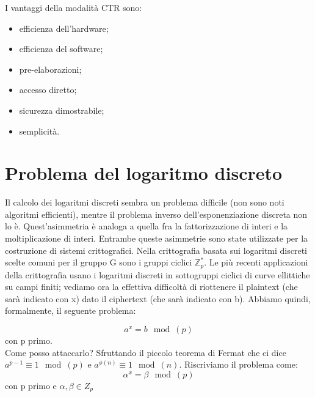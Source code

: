 \documentclass[10pt,a4paper]{article}
\begin{document}
I vantaggi della modalità CTR sono:
\begin{itemize}
\item efficienza dell'hardware;
\item efficienza del software;
\item pre-elaborazioni;
\item accesso diretto;
\item sicurezza dimostrabile;
\item semplicità.
\end{itemize}
    
\section{Problema del logaritmo discreto}
Il calcolo dei logaritmi discreti sembra un problema difficile (non sono noti algoritmi efficienti), mentre il problema inverso dell'esponenziazione discreta non lo è. Quest'asimmetria è analoga a quella fra la fattorizzazione di interi e la moltiplicazione di interi. Entrambe queste asimmetrie sono state utilizzate per la costruzione di sistemi crittografici. Nella crittografia basata sui logaritmi discreti scelte comuni per il gruppo G sono i gruppi ciclici $\mathbb{Z}_p^*$. Le più recenti applicazioni della crittografia usano i logaritmi discreti in sottogruppi ciclici di curve ellittiche su campi finiti; vediamo ora la effettiva difficoltà di riottenere il plaintext (che sarà indicato con x) dato il ciphertext (che sarà indicato con b). Abbiamo quindi, formalmente, il seguente problema:

$$ a^x=b\mod(p)$$ con p primo.\\

Come posso attaccarlo? Sfruttando il piccolo teorema di Fermat che ci dice $a^{p-1} \equiv 1 \mod(p)$ e $a^{\phi(n)}\equiv 1 \mod(n)$. Riscriviamo il problema come:\\

$$ \alpha^x=\beta\mod(p)$$ con p primo e $\alpha,\beta \in Z_p$\\
\end{document}
